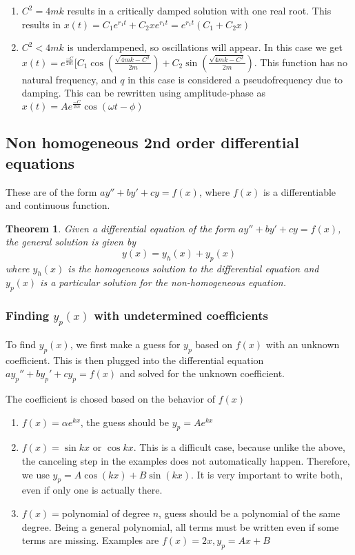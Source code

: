 \documentclass{article}
\newtheorem{theorem}{Theorem}
\begin{document}
\begin{enumerate}[Opt. a: ]
\begin{enumerate}
			\item $C^2=4mk$ results in a critically damped solution with one real root. This results in $x(t)=C_1e^{r_1t}+C_2xe^{r_1t}=e^{r_1t}(C_1+C_2x)$
			\item $C^2<4mk$ is underdampened, so oscillations will appear. 
				In this case we get $x(t)=e^{\frac{-C}{2m}}[C_1\cos{(\frac{\sqrt{4mk-C^2}}{2m})}+C_2\sin{(\frac{\sqrt{4mk-C^2}}{2m})}$. 
				This function has no natural frequency, and $q$ in this case is considered a pseudofrequency due to damping.
			This can be rewritten using amplitude-phase as $x(t)=Ae^{\frac{-C}{2m}}\cos{(\omega t-\phi)}$
		\end{enumerate}
\end{enumerate}

\subsection{Non homogeneous 2nd order differential equations}
These are of the form $ay''+by'+cy=f(x)$, where $f(x)$ is a differentiable and continuous function.
\begin{theorem}
	Given a differential equation of the form $ay''+by'+cy=f(x)$, the general solution is given by 
	\begin{equation} y(x)=y_h(x)+y_p(x) \end{equation} where $y_h(x)$ is the homogeneous solution to the
	differential equation and $y_p(x)$ is a particular solution for the non-homogeneous equation.
\end{theorem}

\subsubsection{Finding $y_p(x)$ with undetermined coefficients}

To find $y_p(x)$, we first make a guess for $y_p$ based on $f(x)$ with an unknown coefficient. This is then plugged into the differential equation  $ay_p''+by_p'+cy_p=f(x)$ and solved for the unknown coefficient.

The coefficient is chosed based on the behavior of $f(x)$

\begin{enumerate}
	\item $f(x)=\alpha e^{kx}$, the guess should be $y_p=Ae^{kx}$
	\item $f(x)=\sin{kx}$ or $\cos{kx}$. This is a difficult case, because unlike the above, the canceling step in the examples does not automatically happen.
		Therefore, we use $y_p=A\cos{(kx)}+B\sin{(kx)}$. It is very important to write both, even if only one is actually there.
	\item $f(x)=$polynomial of degree $n$, guess should be a polynomial of the same degree.
		Being a general polynomial, all terms must be written even if some terms are missing. Examples are $f(x)=2x, y_p=Ax+B$
\end{enumerate}
\end{document}
